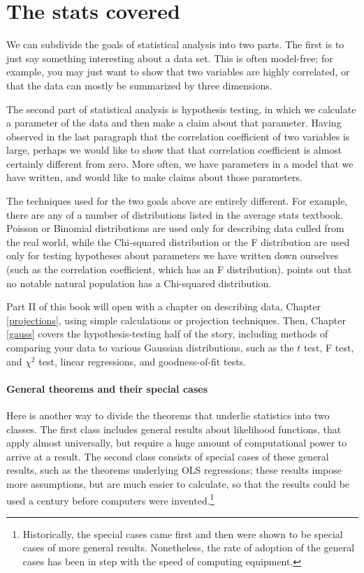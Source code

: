 



\section{The stats covered} 
We can subdivide the goals of statistical analysis into two parts. The
first is to just say something interesting about a data set. This is often
model-free; for example, you may just want to show that two variables
are highly correlated, or that the data can mostly be summarized by three
dimensions.

The second part of statistical analysis is hypothesis testing, in which
we calculate a parameter of the data and then make a claim about that
parameter.  Having observed in the last paragraph that the correlation
coefficient of two variables is large, perhaps we would like to show
that that correlation coefficient is almost certainly different from
zero. More often, we have parameters in a model that we have written,
and would like to make claims about those parameters.

The techniques used for the two goals above are entirely different. For
example, there are any of a number of distributions listed in the
average stats textbook.  Poisson or Binomial distributions are used
only for describing data culled from the real world, while the Chi-squared
distribution or the F distribution are used only for testing hypotheses
about parameters we have written down ourselves (such as the correlation
coefficient, which has an F distribution). \citet[p 141]{kmenta} points out
that no notable natural population has a Chi-squared distribution.

Part II of this book will open with a chapter on describing data,
Chapter \ref{projections}, using simple calculations or projection
techniques. Then, Chapter \ref{gauss} covers the hypothesis-testing
half of the story, including methods of comparing your data to various
Gaussian distributions, such as the $t$ test, F test, and $\chi^2$ test,
linear regressions, and goodness-of-fit tests.



\paragraph{General theorems and their special cases}
Here is another way to divide the theorems that underlie
statistics into two classes. The first class includes general
results about likelihood functions, that 
apply almost universally, but require a huge
amount of computational power to arrive at a result. The second class
consists of special cases of these general results, such as the theorems
underlying OLS regressions; these results impose more
assumptions, but are much easier to calculate, so that the results could
be used a century before computers were invented.\footnote{Historically,
the special cases came first and then were shown to be special cases of
more general results. Nonetheless, the rate of adoption of the general
cases has been in step with the speed of computing equipment.}

